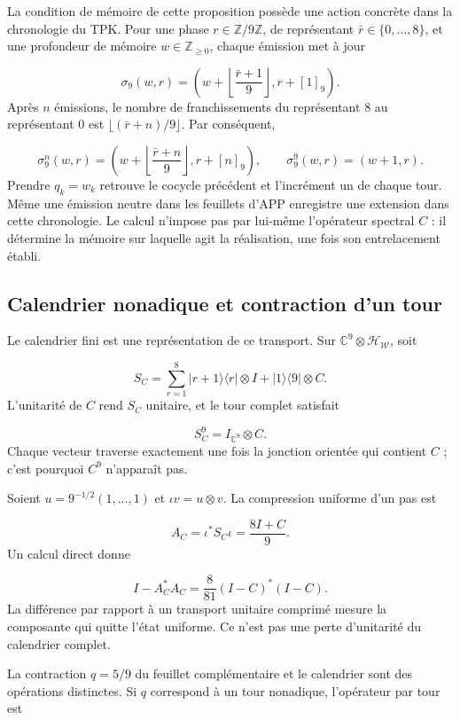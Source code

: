 La condition de mémoire de cette proposition possède une action concrète dans la chronologie du TPK. Pour une phase \(r\in\mathbb Z/9\mathbb Z\), de représentant \(\bar r\in\{0,\ldots,8\}\), et une profondeur de mémoire \(w\in\mathbb Z_{\geq0}\), chaque émission met à jour

\[
\sigma_9(w,r)=
\left(w+\left\lfloor\frac{\bar r+1}{9}\right\rfloor,r+[1]_9\right).
\]
Après \(n\) émissions, le nombre de franchissements du représentant \(8\) au représentant \(0\) est \(\lfloor(\bar r+n)/9\rfloor\). Par conséquent,

\[
\sigma_9^n(w,r)=
\left(w+\left\lfloor\frac{\bar r+n}{9}\right\rfloor,r+[n]_9\right),
\qquad
\sigma_9^9(w,r)=(w+1,r).
\]
Prendre \(q_k=w_k\) retrouve le cocycle précédent et l'incrément un de chaque tour. Même une émission neutre dans les feuillets d'APP enregistre une extension dans cette chronologie. Le calcul n'impose pas par lui-même l'opérateur spectral \(C\) : il détermine la mémoire sur laquelle agit la réalisation, une fois son entrelacement établi.

\subsection{Calendrier nonadique et contraction d’un tour}
\label{rz:calendario}
Le calendrier fini est une représentation de ce transport. Sur \(\mathbb C^9\otimes\mathcal H_{\mathscr W}\), soit

\[
S_C=\sum_{r=1}^{8}|r+1\rangle\langle r|\otimes I
+|1\rangle\langle9|\otimes C.
\]
L'unitarité de \(C\) rend \(S_C\) unitaire, et le tour complet satisfait

\[
S_C^9=I_{\mathbb C^9}\otimes C.
\]
Chaque vecteur traverse exactement une fois la jonction orientée qui contient \(C\) ; c’est pourquoi \(C^9\) n’apparaît pas.

Soient \(u=9^{-1/2}(1,\ldots,1)\) et \(\iota v=u\otimes v\). La compression uniforme d'un pas est

\[
A_C=\iota^*S_C\iota=\frac{8I+C}{9}.
\]
Un calcul direct donne

\[
I-A_C^*A_C
=\frac8{81}(I-C)^*(I-C).
\]
La différence par rapport à un transport unitaire comprimé mesure la composante qui quitte l'état uniforme. Ce n'est pas une perte d'unitarité du calendrier complet.

La contraction \(q=5/9\) du feuillet complémentaire et le calendrier sont des opérations distinctes. Si \(q\) correspond à un tour nonadique, l’opérateur par tour est

